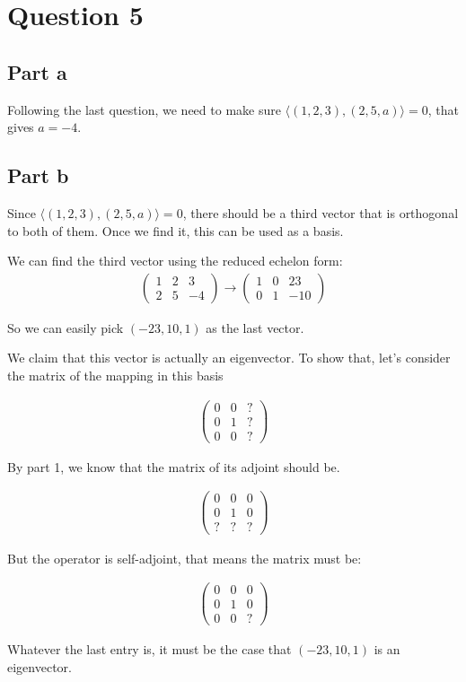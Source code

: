 \section*{Question 5}
\subsection*{Part a}
Following the last question, we need to make sure $ \langle (1, 2, 3), (2, 5, a) \rangle = 0 $, that gives $ a = -4 $.

\subsection*{Part b}
Since $ \langle (1, 2, 3), (2, 5, a) \rangle = 0 $, there should be a third vector that is orthogonal to both of them. Once we find it, this can be used as a basis.

We can find the third vector using the reduced echelon form:
\begin{eqnarray*}
  \left(\begin{array}{ccc}
    1 & 2 & 3 \\
    2 & 5 & -4
  \end{array}\right) \to
  \left(\begin{array}{ccc}
    1 & 0 &  23 \\
    0 & 1 & -10
  \end{array}\right) 
\end{eqnarray*}

So we can easily pick $ (-23, 10, 1) $ as the last vector.

We claim that this vector is actually an eigenvector. To show that, let's consider the matrix of the mapping in this basis

\begin{eqnarray*}
\left(\begin{array}{ccc}
0 & 0 & ? \\
0 & 1 & ? \\
0 & 0 & ?
\end{array}\right)
\end{eqnarray*}

By part 1, we know that the matrix of its adjoint should be.

\begin{eqnarray*}
\left(\begin{array}{ccc}
0 & 0 & 0 \\
0 & 1 & 0 \\
? & ? & ?
\end{array}\right)
\end{eqnarray*}

But the operator is self-adjoint, that means the matrix must be:

\begin{eqnarray*}
\left(\begin{array}{ccc}
0 & 0 & 0 \\
0 & 1 & 0 \\
0 & 0 & ?
\end{array}\right)
\end{eqnarray*}

Whatever the last entry is, it must be the case that $ (-23, 10, 1) $ is an eigenvector.
